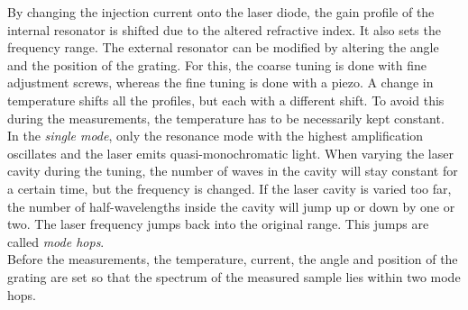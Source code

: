 By changing the injection current onto the laser diode, the gain profile of the internal resonator is shifted due to the altered refractive index. It also sets the frequency range. The external resonator can be modified by altering the angle and the position of the grating. For this, the coarse tuning is done with fine adjustment screws, whereas the fine tuning is done with a piezo. A change in temperature shifts all the profiles, but each with a different shift. To avoid this during the measurements, the temperature has to be necessarily kept constant.\\
In the \emph{single mode}, only the resonance mode with the highest amplification oscillates and the laser emits quasi-monochromatic light.
When varying the laser cavity during the tuning, the number of waves in the cavity will stay constant for a certain time, but the frequency is changed. If the laser cavity is varied too far, the number of half-wavelengths inside the cavity will jump up or down by one or two. The laser frequency jumps back into the original range. This jumps are called \emph{mode hops}.\\
Before the measurements, the temperature, current, the angle and position of the grating are set so that the spectrum of the measured sample lies within two mode hops.

